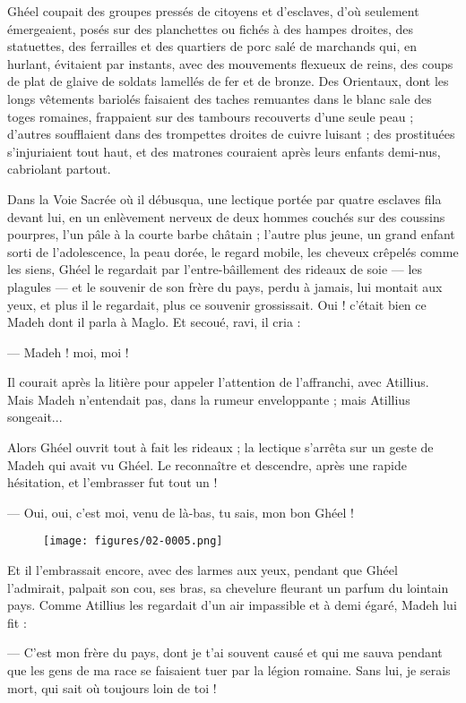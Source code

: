 \documentclass[a4paper, 11pt, oneside, polutonikogreek, french]{article}
\begin{document}
Ghéel coupait des groupes pressés de citoyens et d'esclaves, d'où seulement émergeaient, posés sur des planchettes ou fichés à des hampes droites, des statuettes, des ferrailles et des quartiers de porc salé de marchands qui, en hurlant, évitaient par instants, avec des mouvements flexueux de reins, des coups de plat de glaive de soldats lamellés de fer et de bronze. Des Orientaux, dont les longs vêtements bariolés faisaient des taches remuantes dans le blanc sale des toges romaines, frappaient sur des tambours recouverts d'une seule peau ; d'autres soufflaient dans des trompettes droites de cuivre luisant ; des prostituées s'injuriaient tout haut, et des matrones couraient après leurs enfants demi-nus, cabriolant partout.

Dans la Voie Sacrée où il débusqua, une lectique portée par quatre esclaves fila devant lui, en un enlèvement nerveux de deux hommes couchés sur des coussins pourpres, l'un pâle à la courte barbe châtain ; l'autre plus jeune, un grand enfant sorti de l'adolescence, la peau dorée, le regard mobile, les cheveux crêpelés comme les siens, Ghéel le regardait par l'entre-bâillement des rideaux de soie --- les plagules --- et le souvenir de son frère du pays, perdu à jamais, lui montait aux yeux, et plus il le regardait, plus ce souvenir grossissait. Oui ! c'était bien ce Madeh dont il parla à Maglo. Et secoué, ravi, il cria :

--- Madeh ! moi, moi !

Il courait après la litière pour appeler l'attention de l'affranchi, avec Atillius. Mais Madeh n'entendait pas, dans la rumeur enveloppante ; mais Atillius songeait...

Alors Ghéel ouvrit tout à fait les rideaux ; la lectique s'arrêta sur un geste de Madeh qui avait vu Ghéel. Le reconnaître et descendre, après une rapide hésitation, et l'embrasser fut tout un !

--- Oui, oui, c'est moi, venu de là-bas, tu sais, mon bon Ghéel !
\begin{figure}[H]
\centering
\texttt{[image: figures/02-0005.png]}
\end{figure}
Et il l'embrassait encore, avec des larmes aux yeux, pendant que Ghéel l'admirait, palpait son cou, ses bras, sa chevelure fleurant un parfum du lointain pays. Comme Atillius les regardait d'un air impassible et à demi égaré, Madeh lui fit :

--- C'est mon frère du pays, dont je t'ai souvent causé et qui me sauva pendant que les gens de ma race se faisaient tuer par la légion romaine. Sans lui, je serais mort, qui sait où toujours loin de toi !
\end{document}
